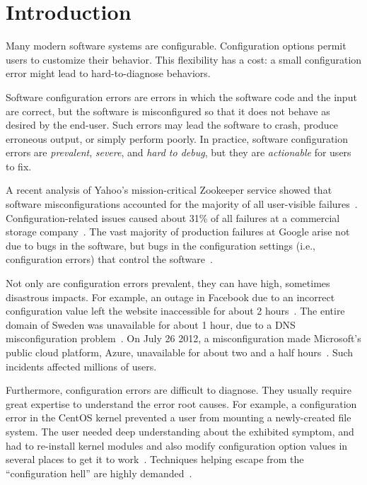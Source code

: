 
\section{Introduction}
\label{sec:introduction}

Many modern software systems are configurable.
Configuration options permit users to
customize their behavior. This flexibility has a cost:
a small configuration error might lead to hard-to-diagnose
behaviors.

Software configuration errors are errors in which
the software code and the input are correct, but the software is
misconfigured so that it does not behave
as desired by the end-user. Such errors may lead
the software to crash,
produce erroneous output, or simply perform poorly.
In practice, software configuration
errors are \textit{prevalent}, \textit{severe}, and
\textit{hard to debug}, but they are \textit{actionable} for users to fix.


A recent analysis of Yahoo's mission-critical Zookeeper service
showed that software misconfigurations accounted for
the majority of all user-visible failures~\cite{bft}.
Configuration-related issues caused about 31\% of all
failures at a commercial storage company~\cite{Yin:2011:ESC}.
The vast majority of production failures at Google
arise not due to bugs in the software, but bugs in the
configuration settings (i.e., configuration errors)
that control the software~\cite{googleconf}.

Not only are configuration errors prevalent, they
can have high, sometimes disastrous impacts. For example,
an outage in Facebook due to
an incorrect configuration value left the website 
inaccessible for about 2 hours~\cite{fbout}. 
The entire  domain of Sweden was unavailable
for about 1 hour, due to a DNS misconfiguration problem~\cite{sedown}.
On July 26 2012, 
a misconfiguration made 
Microsoft's public cloud platform, Azure,
unavailable for about two and a half hours~\cite{msdown}.
Such incidents affected millions of users.

Furthermore, configuration errors are difficult to diagnose. 
They usually require great expertise to understand
the error root causes. For example, a
configuration error in the CentOS kernel prevented
a user from mounting a newly-created file system.
The user needed deep understanding about the
exhibited symptom,  and had to re-install kernel modules and
also modify configuration option values in
several places to get it to work~\cite{Yin:2011:ESC}.
Techniques helping escape from the ``configuration hell''
are highly demanded~\cite{googleconf}.

